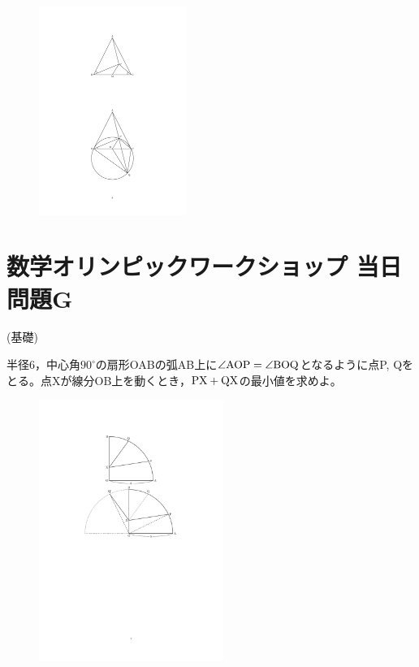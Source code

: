 \documentclass[a4paper,12pt,uplatex]{jsarticle}  %
\begin{document}
\begin{enumerate}
\begin{figure}[h]
  \centering
  \includegraphics[width=4.8cm]{jizen_5_2_solution.pdf}
\end{figure}

\end{enumerate}













\newpage

\section*{数学オリンピックワークショップ 当日問題G}

 (基礎)

半径6，中心角$90^{\circ}$の扇形OABの弧AB上に$\angle {\rm AOP} = \angle {\rm BOQ}$となるように点P, Qをとる。点Xが線分OB上を動くとき，$\rm PX+QX$の最小値を求めよ。

\begin{figure}[ht]
  \centering
  \includegraphics[width=6.0cm]{toujitsu_6_problem.pdf}
\end{figure}
\end{document}
